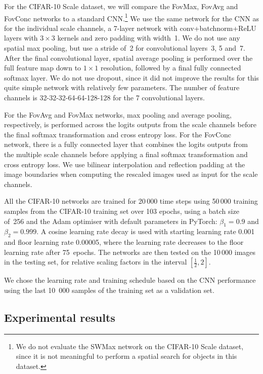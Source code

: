 \documentclass[twocolumn,runningheads]{svjour3}
\begin{document}
For the CIFAR-10 Scale dataset, we will compare the FovMax, FovAvg and
FovConc networks to a standard CNN.\footnote{We do not evaluate the SWMax
network on the CIFAR-10 Scale dataset, since it is not meaningful to
perform a spatial search for objects in this dataset.}
We use the same network for the CNN as for the individual scale channels, a 7-layer network with
conv+batchnorm+ReLU layers with $3 \times 3$  kernels and zero padding with width~1. We do not use any spatial max pooling, but use a stride of~2 for convolutional layers~3, 5 and~7.
After the final convolutional layer, spatial average pooling is performed over the full feature map down to $1 \times 1$ resolution, followed by a final fully connected softmax layer.
We do not use dropout, since it did not improve the results for this quite simple network with relatively few parameters. The number of feature channels is 32-32-32-64-64-128-128 for the 7 convolutional layers.

For the FovAvg and FovMax networks, max pooling and average
pooling, respectively, is performed across the logits outputs from the scale channels before the final softmax transformation and cross entropy loss.
For the FovConc network, there is a fully connected layer that combines the logits outputs from the multiple scale channels before applying a final softmax transformation and cross entropy loss.
We use bilinear interpolation and reflection padding at the image boundaries when computing the rescaled images used as input for the scale channels.

All the CIFAR-10 networks are trained for 20\,000 time steps using 50\,000 training samples from the CIFAR-10 training set over
103 epochs, using a batch size of~256 and the Adam optimiser
with default parameters in PyTorch: $\beta_1 = 0.9$ and $\beta_2 = 0.999$.
A cosine learning rate decay is used with
starting learning rate 0.001 and floor learning rate 0.00005,
where the learning rate decreases to the floor learning rate after 75~epochs.
The networks are then tested
on the 10\,000 images in the testing set, for relative scaling
factors in the interval $[\frac{1}{2}, 2]$.

We chose the learning rate and training schedule based on the CNN performance using the last
10\, 000 samples of the training set as a validation set.

\subsection{Experimental results}
\end{document}
